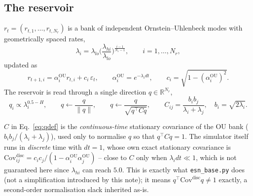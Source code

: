 \documentclass[11pt]{article}
\begin{document}
\subsection{The reservoir}
\label{sec:reservoir}
$r_t=(r_{t,1},\dots,r_{t,N_r})$ is a bank of independent
Ornstein--Uhlenbeck modes with geometrically spaced rates,
\begin{equation}
\lambda_i = \lambda_{lo}\Big(\frac{\lambda_{hi}}{\lambda_{lo}}\Big)^{\frac{i-1}{N_r-1}},
\qquad i=1,\dots,N_r,
\label{eq:lambdas}
\end{equation}
updated as
\begin{equation}
r_{t+1,i} = \alpha_i^{\text{OU}} r_{t,i} + c_i\,\varepsilon_t, \qquad
\alpha_i^{\text{OU}} = e^{-\lambda_i dt}, \qquad c_i = \sqrt{1-(\alpha_i^{\text{OU}})^2}.
\label{eq:reservoirupdate}
\end{equation}
The reservoir is read through a single direction $q\in\mathbb R^{N_r}$,
\begin{equation}
q_i \propto \lambda_i^{0.5-H}, \qquad
q \leftarrow \frac{q}{\lVert q\rVert}, \qquad
q \leftarrow \frac{q}{\sqrt{q^\top C q}}, \qquad
C_{ij} = \frac{b_i b_j}{\lambda_i+\lambda_j}, \quad b_i=\sqrt{2\lambda_i}.
\label{eq:qdef}
\end{equation}

\begin{note}
$C$ in Eq.~\eqref{eq:qdef} is the \emph{continuous-time} stationary
covariance of the OU bank ($b_ib_j/(\lambda_i+\lambda_j)$), used only
to normalise $q$ so that $q^\top C q=1$. The simulator itself runs in
\emph{discrete} time with $dt=1$, whose own exact stationary
covariance is $\mathrm{Cov}^{\text{disc}}_{ij}=c_ic_j/(1-\alpha_i^{\text{OU}}\alpha_j^{\text{OU}})$
-- close to $C$ only when $\lambda_i dt\ll1$, which is not guaranteed
here since $\lambda_{hi}$ can reach $5.0$. This is exactly what
\texttt{esn\_base.py} does (not a simplification introduced by this
note); it means $q^\top\mathrm{Cov}^{\text{disc}}q\ne1$ exactly, a
second-order normalisation slack inherited as-is.
\end{note}
\end{document}
